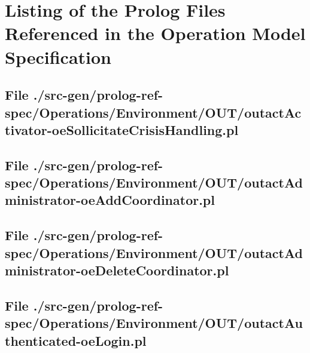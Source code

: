 \chapter{Listing of the Prolog Files Referenced in the Operation Model Specification}

\section[File /src-gen/prolog-ref-spec.../outactActivator-oeSollicitateCrisisHandling.pl]{File ./src-gen/prolog-ref-spec/Operations/Environment/OUT/outactActivator-oeSollicitateCrisisHandling.pl}
\scriptsize

\normalsize
	
\section[File /src-gen/prolog-ref-spec.../outactAdministrator-oeAddCoordinator.pl]{File ./src-gen/prolog-ref-spec/Operations/Environment/OUT/outactAdministrator-oeAddCoordinator.pl}
\scriptsize

\normalsize
	
\section[File /src-gen/prolog-ref-spec.../outactAdministrator-oeDeleteCoordinator.pl]{File ./src-gen/prolog-ref-spec/Operations/Environment/OUT/outactAdministrator-oeDeleteCoordinator.pl}
\scriptsize

\normalsize
	
\section[File /src-gen/prolog-ref-spec/Operations.../outactAuthenticated-oeLogin.pl]{File ./src-gen/prolog-ref-spec/Operations/Environment/OUT/outactAuthenticated-oeLogin.pl}
\scriptsize

\normalsize
	
